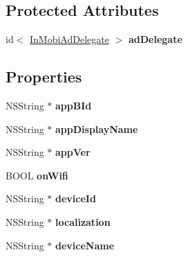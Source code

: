 \subsection*{Protected Attributes}
\begin{DoxyCompactItemize}
\item 
\hypertarget{interface_user_info_a7f814cbe070854ed569f941eb7135c4f}{
id$<$ \hyperlink{protocol_in_mobi_ad_delegate-p}{InMobiAdDelegate} $>$ {\bfseries adDelegate}}
\label{interface_user_info_a7f814cbe070854ed569f941eb7135c4f}

\end{DoxyCompactItemize}
\subsection*{Properties}
\begin{DoxyCompactItemize}
\item 
\hypertarget{interface_user_info_ac1f6a87fd74e19f329818070b9e6103f}{
NSString $\ast$ {\bfseries appBId}}
\label{interface_user_info_ac1f6a87fd74e19f329818070b9e6103f}

\item 
\hypertarget{interface_user_info_a10175088627186409c91e938ea7fc6ef}{
NSString $\ast$ {\bfseries appDisplayName}}
\label{interface_user_info_a10175088627186409c91e938ea7fc6ef}

\item 
\hypertarget{interface_user_info_ac384adb23447bf26941c9357dbf46214}{
NSString $\ast$ {\bfseries appVer}}
\label{interface_user_info_ac384adb23447bf26941c9357dbf46214}

\item 
\hypertarget{interface_user_info_a03684c5788c4b00607bb8c4240cd7d15}{
BOOL {\bfseries onWifi}}
\label{interface_user_info_a03684c5788c4b00607bb8c4240cd7d15}

\item 
\hypertarget{interface_user_info_af67e703e080ee259fb454a83a15ba694}{
NSString $\ast$ {\bfseries deviceId}}
\label{interface_user_info_af67e703e080ee259fb454a83a15ba694}

\item 
\hypertarget{interface_user_info_af933c90d11538c9aa282aee796a495d8}{
NSString $\ast$ {\bfseries localization}}
\label{interface_user_info_af933c90d11538c9aa282aee796a495d8}

\item 
\hypertarget{interface_user_info_a5c44c4fdf5503ed6c238ef387ee1fdca}{
NSString $\ast$ {\bfseries deviceName}}
\label{interface_user_info_a5c44c4fdf5503ed6c238ef387ee1fdca}


\end{DoxyCompactItemize}
